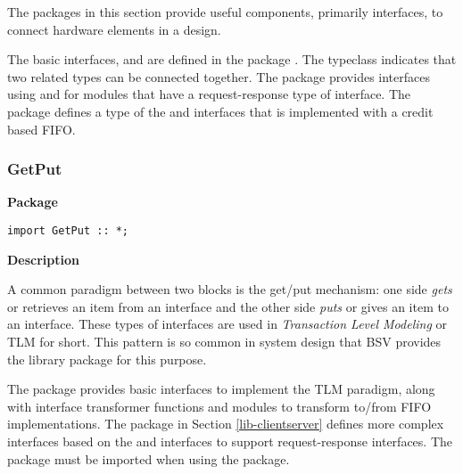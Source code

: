 The packages in this section provide useful components, primarily
interfaces, to connect hardware elements in a design.  

The basic interfaces, 
and  are defined in the package . The
typeclass  indicates that two related types can be
connected together.  The
package   provides interfaces using  and
    for
modules that have a request-response type of interface.  The package
 defines a type of the  and  interfaces
that is implemented with a credit based FIFO.


\subsubsection{GetPut}
\label{sec-GetPut}

{\bf Package}

\begin{verbatim}
import GetPut :: *;
\end{verbatim}


{\bf Description}

A common paradigm between two blocks is the  get/put mechanism:  one
side {\em gets} or retrieves an item from an interface and the other
side {\em puts} or gives an item to an interface.  These types of
interfaces are used in {\em Transaction Level Modeling} or TLM for
short.  This pattern is so common in system design that BSV provides
the  library package for this purpose.

The  package provides basic interfaces to implement the TLM
paradigm, along with interface transformer functions and modules to
transform to/from FIFO implementations.  The  package
in Section \ref{lib-clientserver} defines more complex interfaces
based on the  and  interfaces to support
request-response interfaces.  The  package must be imported
when using the  package.



